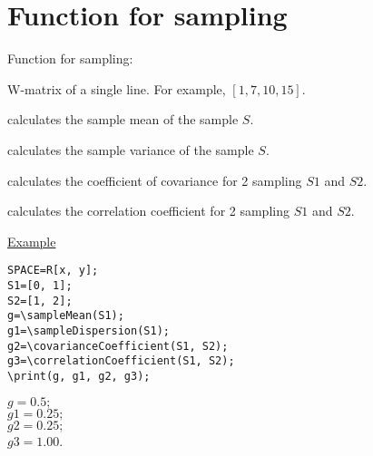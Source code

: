 \section{Function for sampling}

Function for sampling:

W-matrix of a single line. For example,  $[1, 7, 10, 15]$. 

 calculates the sample mean of the sample $S$. 

 calculates the sample variance of the sample $S$. 

 calculates the coefficient of covariance for 2 sampling $S1$ and $S2$. 

 calculates the correlation coefficient for 2 sampling $S1$ and $S2$. 

\underline{Example}

\vspace*{-2mm}
\begin{verbatim}
SPACE=R[x, y];
S1=[0, 1]; 
S2=[1, 2];
g=\sampleMean(S1); 
g1=\sampleDispersion(S1); 
g2=\covarianceCoefficient(S1, S2); 
g3=\correlationCoefficient(S1, S2); 
\print(g, g1, g2, g3);
\end{verbatim} 

{$g = 0. 5; $\\
\hspace*{4mm} $g1 = 0. 25; $\\
\hspace*{4mm} $g2 = 0. 25; $\\
\hspace*{4mm} $g3 = 1. 00$.} 

 